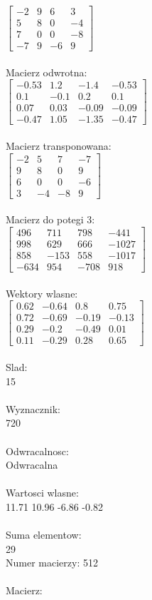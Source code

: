\documentclass[a4paper,12pt]{article}
\begin{document}
$\begin{bmatrix} -2&9&6&3\\5&8&0&-4\\7&0&0&-8\\-7&9&-6&9 \end{bmatrix}$
\\
\\
Macierz odwrotna:\\

$\begin{bmatrix} -0.53&1.2&-1.4&-0.53\\0.1&-0.1&0.2&0.1\\0.07&0.03&-0.09&-0.09\\-0.47&1.05&-1.35&-0.47 \end{bmatrix}$
\\
\\
Macierz transponowana:\\

$\begin{bmatrix} -2&5&7&-7\\9&8&0&9\\6&0&0&-6\\3&-4&-8&9 \end{bmatrix}$
\\
\\
Macierz do potegi 3:\\

$\begin{bmatrix} 496&711&798&-441\\998&629&666&-1027\\858&-153&558&-1017\\-634&954&-708&918 \end{bmatrix}$
\\
\\
Wektory wlasne:\\

$\begin{bmatrix} 0.62&-0.64&0.8&0.75\\0.72&-0.69&-0.19&-0.13\\0.29&-0.2&-0.49&0.01\\0.11&-0.29&0.28&0.65 \end{bmatrix}$
\\
\\
Slad:\\
15
\\
\\
Wyznacznik:\\
720
\\
\\
Odwracalnosc:\\
Odwracalna
\\
\\
Wartosci wlasne:\\
11.71 10.96 -6.86 -0.82
\\
\\
Suma elementow:\\
29
\\
\newpage
Numer macierzy:
512
\\
\\
Macierz:\\
\end{document}
